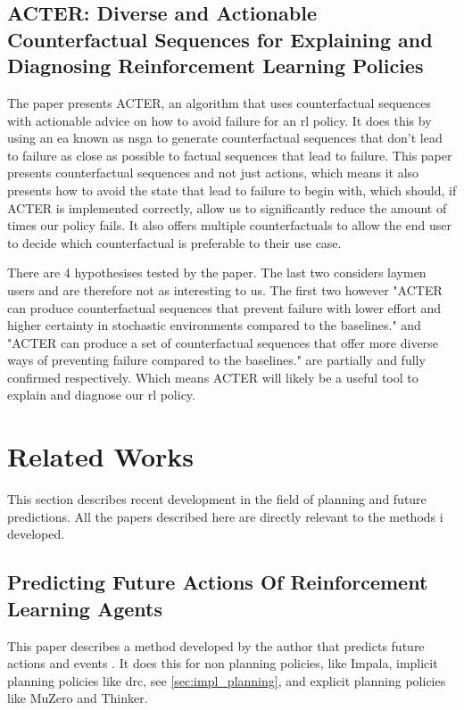 \documentclass[UKenglish]{uiomasterthesis}
\begin{document}
\subsection{ACTER: Diverse and Actionable Counterfactual Sequences for Explaining and Diagnosing Reinforcement Learning Policies}
\label{sec:acter}
The paper presents ACTER, an algorithm that uses counterfactual sequences with actionable advice on how to avoid failure for an \ac{rl} policy. It does this by using an \ac{ea} known as \ac{nsga} to generate counterfactual sequences that don't lead to failure as close as possible to factual sequences that lead to failure. This paper presents counterfactual sequences and not just actions, which means it also presents how to avoid the state that lead to failure to begin with, which should, if ACTER is implemented correctly, allow us to significantly reduce the amount of times our policy fails. It also offers multiple counterfactuals to allow the end user to decide which counterfactual is preferable to their use case.

There are 4 hypothesises tested by the paper. The last two considers laymen users and are therefore not as interesting to us. The first two however "ACTER can produce counterfactual sequences that prevent failure with lower effort and higher certainty in stochastic environments compared to the baselines." and "ACTER can produce a set of counterfactual sequences that offer more diverse ways of preventing failure compared to the baselines." are partially and fully confirmed respectively. Which means ACTER will likely be a useful tool to explain and diagnose our \ac{rl} policy.


\section{Related Works}
This section describes recent development in the field of planning and future predictions. All the papers described here are directly relevant to the methods i developed.

\subsection{Predicting Future Actions Of Reinforcement Learning Agents}
\label{sec:predicting_actions}
This paper describes a method developed by the author that predicts future actions and events \cite{chung2024predictingfutureactionsreinforcement}. It does this for non planning policies, like Impala, implicit planning policies like \ac{drc}, see \cref{sec:impl_planning}, and explicit planning policies like MuZero and Thinker.
\end{document}
